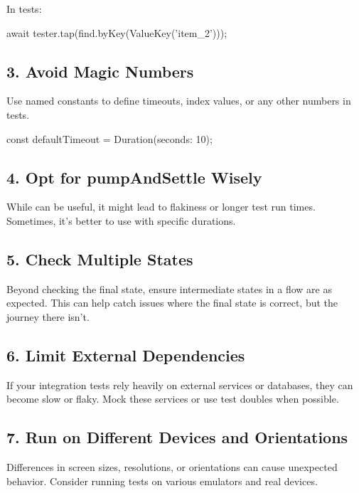 In tests:

\begin{dartcode}
await tester.tap(find.byKey(ValueKey('item_2')));
\end{dartcode}

\subsection*{3. Avoid Magic Numbers}

Use named constants to define timeouts, index values, or any other numbers in tests.

\begin{dartcode}
const defaultTimeout = Duration(seconds: 10);
\end{dartcode}

\subsection*{4. Opt for pumpAndSettle Wisely}

While  can be useful, it might lead to flakiness or longer test run times. 
Sometimes, it's better to use  with specific durations.

\subsection*{5. Check Multiple States}

Beyond checking the final state, ensure intermediate states in a flow are as expected. This can help catch issues where the final state is correct, but the journey there isn't.

\subsection*{6. Limit External Dependencies}

If your integration tests rely heavily on external services or databases, they can become slow or flaky. 
Mock these services or use test doubles when possible.

\subsection*{7. Run on Different Devices and Orientations}

Differences in screen sizes, resolutions, or orientations can cause unexpected behavior. 
Consider running tests on various emulators and real devices.

